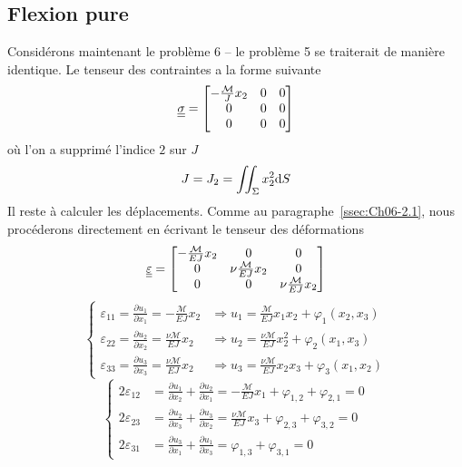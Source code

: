 \subsection{Flexion pure} \label{ssec:Ch07-1.3}
Considérons maintenant le problème 6 -- le problème 5 se traiterait de manière identique.
Le tenseur des contraintes a la forme suivante
\begin{equation}
    \underline{\underline{\sigma}} = 
    \begin{bmatrix}
        -\frac{\mathcal{M}}{J}x_2 & 0 & 0 \\
        0 & 0 & 0 \\
        0 & 0 & 0
    \end{bmatrix}
    \label{eq:Ch07-025}
\end{equation}
où l'on a supprimé l'indice $2$ sur $J$
\begin{equation}
    J=J_2 = \iint_{\Sigma} x_2^2 \mathrm{d} S
    \label{eq:Ch07-026}
\end{equation}
Il reste à calculer les déplacements.
Comme au paragraphe~\ref{ssec:Ch06-2.1}, nous procéderons directement en écrivant le tenseur des déformations
\begin{equation}
    \underline{\underline{\varepsilon}} = 
    \begin{bmatrix}
        -\frac{\mathcal{M}}{EJ}x_2 & 0 & 0 \\
        0 & \nu\frac{\mathcal{M}}{EJ}x_2 & 0 \\
        0 & 0 & \nu\frac{\mathcal{M}}{EJ}x_2
    \end{bmatrix}
    \label{eq:Ch07-027}
\end{equation}
\begin{equation}
    \left\{
    \begin{aligned}
        \varepsilon_{11} = \frac{\partial u_1}{\partial x_1} = -\frac{\mathcal{M}}{EJ}x_2 & \Rightarrow u_1 = \frac{\mathcal{M}}{EJ}x_1x_2 + \varphi_1 \left( x_2,x_3 \right) \\
        \varepsilon_{22} = \frac{\partial u_2}{\partial x_2} = \frac{\nu\mathcal{M}}{EJ}x_2 & \Rightarrow u_2 = \frac{\nu\mathcal{M}}{EJ}x_2^2 + \varphi_2 \left( x_1,x_3 \right) \\
        \varepsilon_{33} = \frac{\partial u_3}{\partial x_3} = \frac{\nu\mathcal{M}}{EJ}x_2 & \Rightarrow u_3 = \frac{\nu\mathcal{M}}{EJ}x_2x_3 + \varphi_3 \left( x_1,x_2 \right)
    \end{aligned}
    \right.
    \label{eq:Ch07-028}
\end{equation}
\begin{equation}
    \left\{
    \begin{aligned}
        2 \varepsilon_{12} &= \frac{\partial u_1}{\partial x_2} + \frac{\partial u_2}{\partial x_1} = - \frac{\mathcal{M}}{EJ}x_1 + \varphi_{1,2} + \varphi_{2,1} = 0 \\
        2 \varepsilon_{23} &= \frac{\partial u_2}{\partial x_3} + \frac{\partial u_3}{\partial x_2} = \frac{\nu\mathcal{M}}{EJ}x_3 + \varphi_{2,3} + \varphi_{3,2} = 0 \\
        2 \varepsilon_{31} &= \frac{\partial u_3}{\partial x_1} + \frac{\partial u_1}{\partial x_3} = \varphi_{1,3} + \varphi_{3,1} = 0
    \end{aligned}
    \right.
    \label{eq:Ch07-029}
\end{equation}
